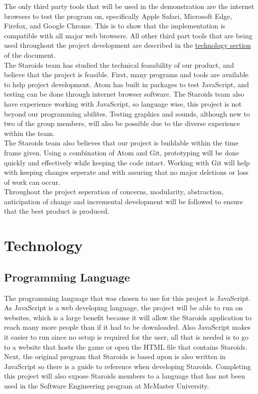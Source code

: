\documentclass{article}
\begin{document}
The only third party tools that will be used in the demonstration are the internet browsers to test the program on, specifically Apple Safari, Microsoft Edge, Firefox, and Google Chrome. This is to show that the implementation is compatible with all major web browsers. All other third part tools that are being used throughout the project development are described in the \hyperref[technology:ide]{technology section} of the document.\\

The Staroids team has studied the technical feasability of our product, and believe that the project is feasible. First, many programs and tools are available to help project development. Atom has built in packages to test JavaScript, and testing can be done through internet browser software. The Staroids team also have experience working with JavaScript, so language wise, this project is not beyond our programming abilites. Testing graphics and sounds, although new to two of the group members, will also be possible due to the diverse experience within the team.\\
The Staroids team also believes that our project is buildable within the time frame given. Using a combination of Atom and Git, prototyping will be done quickly and effectively while keeping the code intact. Working with Git will help with keeping changes seperate and with assuring that no major deletions or loss of work can occur.\\
Throughout the project seperation of concerns, modularity, abstraction, anticipation of change and incremental development will be followed to ensure that the best product is produced.

\section{Technology}
\subsection{Programming Language}
The programming language that was chosen to use for this project is JavaScript. As JavaScript is a web developing language, the project will be able to run on websites, which is a large benefit because it will allow the Staroids application to reach many more people than if it had to be downloaded. Also JavaScript makes it easier to run since no setup is required for the user, all that is needed is to go to a website that hosts the game or open the HTML file that contains Staroids. Next, the original program that Staroids is based upon is also written in JavaScript so there is a guide to reference when developing Staroids. Completing this project will also expose Staroids members to a language that has not been used in the Software Engineering program at McMaster University.
\end{document}
